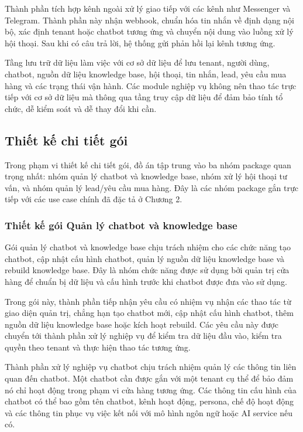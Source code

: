 \documentclass[../DoAn.tex]{subfiles}
\begin{document}
Thành phần tích hợp kênh ngoài xử lý giao tiếp với các kênh như Messenger và Telegram. Thành phần này nhận webhook, chuẩn hóa tin nhắn về định dạng nội bộ, xác định tenant hoặc chatbot tương ứng và chuyển nội dung vào luồng xử lý hội thoại. Sau khi có câu trả lời, hệ thống gửi phản hồi lại kênh tương ứng.

Tầng lưu trữ dữ liệu làm việc với cơ sở dữ liệu để lưu tenant, người dùng, chatbot, nguồn dữ liệu knowledge base, hội thoại, tin nhắn, lead, yêu cầu mua hàng và các trạng thái vận hành. Các module nghiệp vụ không nên thao tác trực tiếp với cơ sở dữ liệu mà thông qua tầng truy cập dữ liệu để đảm bảo tính tổ chức, dễ kiểm soát và dễ thay đổi khi cần.

\subsection{Thiết kế chi tiết gói}

Trong phạm vi thiết kế chi tiết gói, đồ án tập trung vào ba nhóm package quan trọng nhất: nhóm quản lý chatbot và knowledge base, nhóm xử lý hội thoại tư vấn, và nhóm quản lý lead/yêu cầu mua hàng. Đây là các nhóm package gắn trực tiếp với các use case chính đã đặc tả ở Chương 2.

\subsubsection{Thiết kế gói Quản lý chatbot và knowledge base}

Gói quản lý chatbot và knowledge base chịu trách nhiệm cho các chức năng tạo chatbot, cập nhật cấu hình chatbot, quản lý nguồn dữ liệu knowledge base và rebuild knowledge base. Đây là nhóm chức năng được sử dụng bởi quản trị cửa hàng để chuẩn bị dữ liệu và cấu hình trước khi chatbot được đưa vào sử dụng.

Trong gói này, thành phần tiếp nhận yêu cầu có nhiệm vụ nhận các thao tác từ giao diện quản trị, chẳng hạn tạo chatbot mới, cập nhật cấu hình chatbot, thêm nguồn dữ liệu knowledge base hoặc kích hoạt rebuild. Các yêu cầu này được chuyển tới thành phần xử lý nghiệp vụ để kiểm tra dữ liệu đầu vào, kiểm tra quyền theo tenant và thực hiện thao tác tương ứng.

Thành phần xử lý nghiệp vụ chatbot chịu trách nhiệm quản lý các thông tin liên quan đến chatbot. Một chatbot cần được gắn với một tenant cụ thể để bảo đảm nó chỉ hoạt động trong phạm vi cửa hàng tương ứng. Các thông tin cấu hình của chatbot có thể bao gồm tên chatbot, kênh hoạt động, persona, chế độ hoạt động và các thông tin phục vụ việc kết nối với mô hình ngôn ngữ hoặc AI service nếu có.
\end{document}
